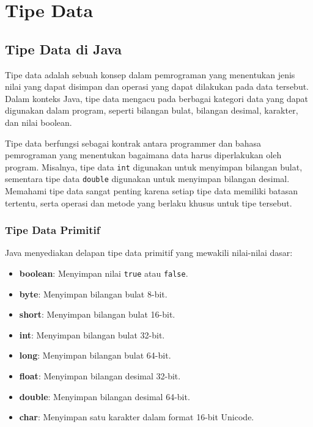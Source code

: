 
\chapter{Tipe Data}
 
\section{Tipe Data di Java}

Tipe data adalah sebuah konsep dalam pemrograman yang menentukan jenis nilai yang dapat disimpan dan operasi yang dapat dilakukan pada data tersebut. Dalam konteks Java, tipe data mengacu pada berbagai kategori data yang dapat digunakan dalam program, seperti bilangan bulat, bilangan desimal, karakter, dan nilai boolean.

Tipe data berfungsi sebagai kontrak antara programmer dan bahasa pemrograman yang menentukan bagaimana data harus diperlakukan oleh program. Misalnya, tipe data \texttt{int} digunakan untuk menyimpan bilangan bulat, sementara tipe data \texttt{double} digunakan untuk menyimpan bilangan desimal. Memahami tipe data sangat penting karena setiap tipe data memiliki batasan tertentu, serta operasi dan metode yang berlaku khusus untuk tipe tersebut.

\subsection{Tipe Data Primitif}
Java menyediakan delapan tipe data primitif yang mewakili nilai-nilai dasar:

\begin{itemize}
	\item \textbf{boolean}: Menyimpan nilai \texttt{true} atau \texttt{false}.
	\item \textbf{byte}: Menyimpan bilangan bulat 8-bit.
	\item \textbf{short}: Menyimpan bilangan bulat 16-bit.
	\item \textbf{int}: Menyimpan bilangan bulat 32-bit.
	\item \textbf{long}: Menyimpan bilangan bulat 64-bit.
	\item \textbf{float}: Menyimpan bilangan desimal 32-bit.
	\item \textbf{double}: Menyimpan bilangan desimal 64-bit.
	\item \textbf{char}: Menyimpan satu karakter dalam format 16-bit Unicode.
\end{itemize}

